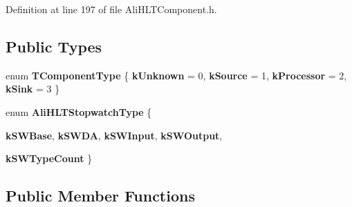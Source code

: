 Definition at line 197 of file Ali\-HLTComponent.h.\subsection*{Public Types}
\begin{CompactItemize}
\item 
enum {\bf TComponent\-Type} \{ {\bf k\-Unknown} = 0, 
{\bf k\-Source} = 1, 
{\bf k\-Processor} = 2, 
{\bf k\-Sink} = 3
 \}
\item 
enum {\bf Ali\-HLTStopwatch\-Type} \{ \par
{\bf k\-SWBase}, 
{\bf k\-SWDA}, 
{\bf k\-SWInput}, 
{\bf k\-SWOutput}, 
\par
{\bf k\-SWType\-Count}
 \}
\end{CompactItemize}
\subsection*{Public Member Functions}
